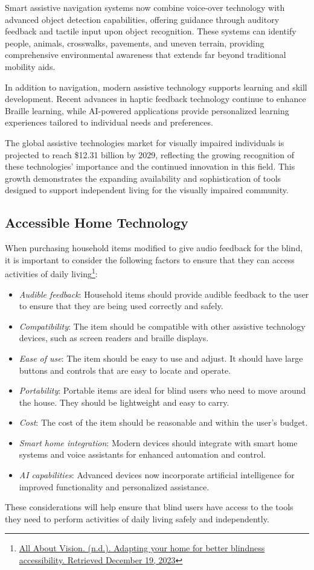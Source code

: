 Smart assistive navigation systems now combine voice-over technology with advanced object detection capabilities, offering guidance through auditory feedback and tactile input upon object recognition. These systems can identify people, animals, crosswalks, pavements, and uneven terrain, providing comprehensive environmental awareness that extends far beyond traditional mobility aids.

In addition to navigation, modern assistive technology supports learning and skill development. Recent advances in haptic feedback technology continue to enhance Braille learning, while AI-powered applications provide personalized learning experiences tailored to individual needs and preferences.

The global assistive technologies market for visually impaired individuals is projected to reach \$12.31 billion by 2029, reflecting the growing recognition of these technologies' importance and the continued innovation in this field. This growth demonstrates the expanding availability and sophistication of tools designed to support independent living for the visually impaired community.

\subsection{Accessible Home Technology}\label{ind-living-tools}
When purchasing household items modified to give audio feedback for the blind, it is important to consider the following factors to ensure that they can access activities of daily living\footnote{\href{http://www.allaboutvision.com/resources/adapting-the-home-better-blindness-accessibility/}{All About Vision. (n.d.). Adapting your home for better blindness accessibility. Retrieved December 19, 2023}}:
\begin{itemize}
 \item \emph{Audible feedback}: Household items should provide audible feedback to the user to ensure that they are being used correctly and safely.
 \item \emph{Compatibility}: The item should be compatible with other assistive technology devices, such as screen readers and braille displays.
 \item \emph{Ease of use}: The item should be easy to use and adjust. It should have large buttons and controls that are easy to locate and operate.
 \item \emph{Portability}: Portable items are ideal for blind users who need to move around the house. They should be lightweight and easy to carry.
 \item \emph{Cost}: The cost of the item should be reasonable and within the user's budget.
 \item \emph{Smart home integration}: Modern devices should integrate with smart home systems and voice assistants for enhanced automation and control.
 \item \emph{AI capabilities}: Advanced devices now incorporate artificial intelligence for improved functionality and personalized assistance.
\end{itemize}
These considerations will help ensure that blind users have access to the tools they need to perform activities of daily living safely and independently.

